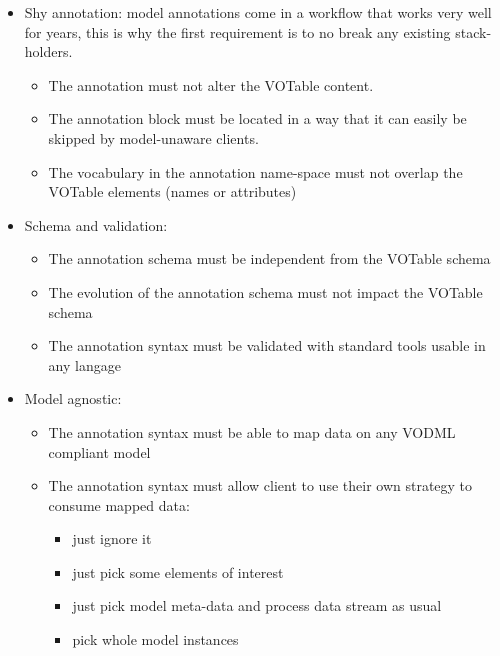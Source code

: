 \begin {itemize}
  \item Shy annotation: model annotations come in a workflow that works very well for years, this is why the first requirement is to no break any existing stack-holders.
  \begin {itemize}
    \item The annotation must not alter the VOTable content.
    \item The annotation block must be located in a way that it can easily be skipped by model-unaware clients.
    \item The vocabulary in the annotation name-space must not overlap the VOTable elements (names or attributes)    
  \end {itemize}
  
  \item Schema and validation:
  \begin {itemize}
    \item The annotation schema must be independent from the VOTable schema
    \item The evolution of the annotation schema must not impact the VOTable schema
    \item The annotation syntax must be validated with standard tools usable in any langage
  \end {itemize}
  
  \item Model agnostic:
  \begin {itemize}
    \item The annotation syntax must be able to map data on any VODML compliant model
    \item The annotation syntax must allow client to use their own strategy to consume mapped data:
      \begin {itemize}
        \item just ignore it
        \item just pick some elements of interest 
        \item just pick model meta-data and process data stream as usual
        \item pick whole model instances
      \end {itemize}
  \end {itemize}
  
\end {itemize}